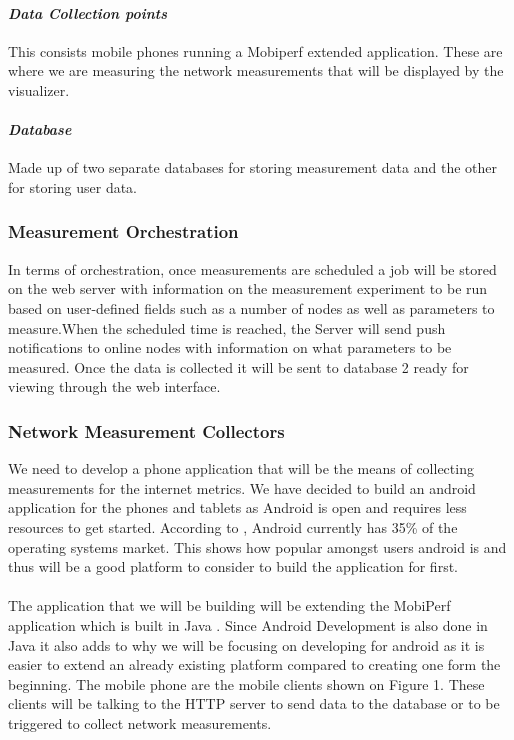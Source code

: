 \paragraph{\textit{Data Collection points}} This consists mobile phones running a Mobiperf extended application. These are where we are measuring the network measurements that will be displayed by the visualizer.
\paragraph{\textit{Database}} Made up of two separate databases for storing measurement data and the other for storing user data.
\subsubsection{Measurement Orchestration}
In terms of orchestration, once measurements are scheduled a job will be stored on the web server with information on the measurement experiment to be run based on user-defined fields such as a number of nodes as well as parameters to measure.When the scheduled time is reached, the Server will send push notifications to online nodes with information on what parameters to be measured. Once the data is collected it will be sent to database 2 ready for viewing through the web interface.
\subsubsection{Network Measurement Collectors}
We need to develop a phone application that will be the means of collecting measurements for the internet metrics. We have decided to build an android application for the phones and tablets as Android is open and requires less resources to get started. According to \cite{statcounter_global_stats}, Android currently has 35\% of the operating systems market. This shows how popular amongst users android is and thus will be a good platform to consider to build the application for first. 
\paragraph{}
The application that we will be building will be extending the MobiPerf application which is built in Java \cite{m-lab}. Since Android Development is also done in Java it also adds to why we will be focusing on developing for android as it is easier to extend an already existing platform compared to creating one form the beginning. The mobile phone are the mobile clients shown on Figure 1. These clients will be talking to the HTTP server to send data to the database or to be triggered to collect network measurements.
